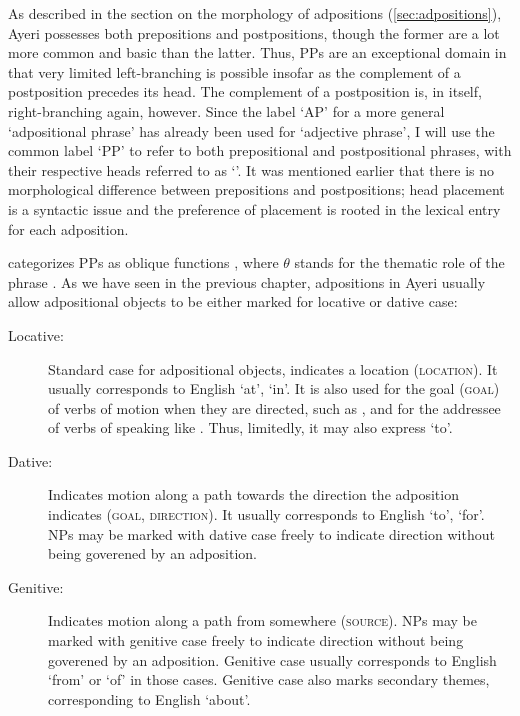 As described in the section on the morphology of adpositions
(\autoref{sec:adpositions}), Ayeri possesses both prepositions and
postpositions, though the former are a lot more common and basic than the
latter. Thus, PPs are an exceptional domain in that very limited left-branching
is possible insofar as the complement of a postposition precedes its head. The
complement of a postposition is, in itself, right-branching again, however.
Since the label `AP' for a more general `adpositional phrase' has already been
used for `adjective phrase', I will use the common label `PP' to refer to both
prepositional and postpositional phrases, with their respective heads referred
to as `'. It was mentioned earlier that there is no morphological
difference between prepositions and postpositions; head placement is a
syntactic issue and the preference of placement is rooted in the lexical entry
for each adposition.

\Lfg{} categorizes PPs as oblique functions 
\Oblique{}, where $\theta$ stands for the thematic role of the phrase
\citep[9--10]{dalrymple2001}. As we have seen in the previous chapter,
adpositions in Ayeri usually allow adpositional objects to be either marked for
locative or dative case:

\begin{description}
	\item[Locative:] Standard case for adpositional objects, indicates a
	location (\textsc{location}). It usually corresponds to English `at', `in'.
	It is also used for the goal (\textsc{goal}) of verbs of motion when they
	are directed, such as , and for the addressee of verbs
	of speaking like . Thus, limitedly, it may also
	express `to'.

	\item[Dative:] Indicates motion along a path towards the direction the
	adposition indicates (\textsc{goal}, \textsc{direction}). It usually
	corresponds to English `to', `for'. NPs may be marked with dative case
	freely to indicate direction without being goverened by an adposition.

	\item[Genitive:] Indicates motion along a path from somewhere 
	(\textsc{source}). NPs may be marked with genitive case freely to indicate
	direction without being goverened by an adposition. Genitive case usually
	corresponds to English `from' or `of' in those cases. Genitive case also
	marks secondary themes, corresponding to English `about'.
\end{description}

